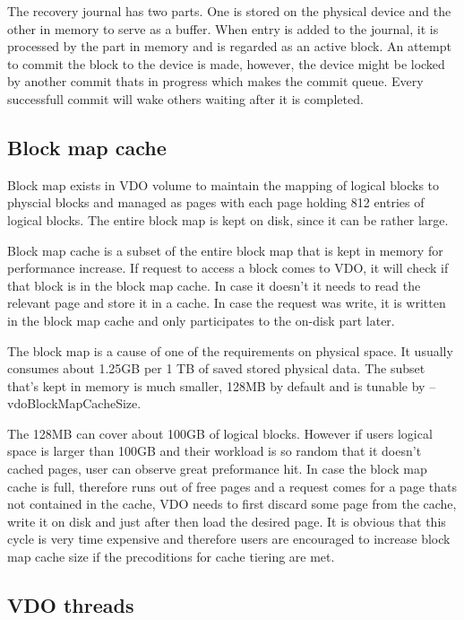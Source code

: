 \documentclass[
  color, %
  table, %
  lof,   %
  lot,   %
]{fithesis3}
\begin{document}
The recovery journal has two parts. One is stored on the physical device and the other in memory to serve as a buffer. When entry is added to the journal, it is processed by the part in memory and is regarded as an active block. An attempt to commit the block to the device is made, however, the device might be locked by another commit thats in progress which makes the commit queue. Every successfull commit will wake others waiting after it is completed.


\subsection{Block map cache}
Block map exists in VDO volume to maintain the mapping of logical blocks to physcial blocks and managed as pages with each page holding 812 entries of logical blocks. The entire block map is kept on disk, since it can be rather large.

Block map cache is a subset of the entire block map that is kept in memory for performance increase. If request to access a block comes to VDO, it will check if that block is in the block map cache. In case it doesn't it needs to read the relevant page and store it in a cache. In case the request was write, it is written in the block map cache and only participates to the on-disk part later.

The block map is a cause of one of the requirements on physical space. It usually consumes about 1.25GB per 1 TB of saved stored physical data. The subset that's kept in memory is much smaller, 128MB by default and is tunable by --vdoBlockMapCacheSize.

The 128MB can cover about 100GB of logical blocks. However if users logical space is larger than 100GB and their workload is so random that it doesn't cached pages, user can observe great preformance hit. In case the block map cache is full, therefore runs out of free pages and a request comes for a page thats not contained in the cache, VDO needs to first discard some page from the cache, write it on disk and just after then load the desired page. It is obvious that this cycle is very time expensive and therefore users are encouraged to increase block map cache size if the precoditions for cache tiering are met.





\subsection{VDO threads}
\end{document}
